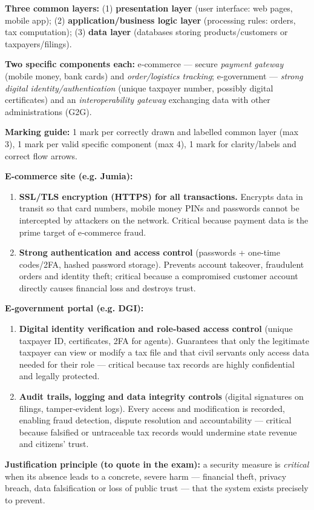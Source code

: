 \documentclass[11pt]{article}
\begin{document}
\begin{corrige}
\textbf{Three common layers:} (1) \textbf{presentation layer} (user interface: web pages, mobile app); (2) \textbf{application/business logic layer} (processing rules: orders, tax computation); (3) \textbf{data layer} (databases storing products/customers or taxpayers/filings).

\textbf{Two specific components each:} e‑commerce — secure \emph{payment gateway} (mobile money, bank cards) and \emph{order/logistics tracking}; e‑government — \emph{strong digital identity/authentication} (unique taxpayer number, possibly digital certificates) and an \emph{interoperability gateway} exchanging data with other administrations (G2G).

\textbf{Marking guide:} 1 mark per correctly drawn and labelled common layer (max 3), 1 mark per valid specific component (max 4), 1 mark for clarity/labels and correct flow arrows.
\end{corrige}

\begin{corrige}
\textbf{E‑commerce site (e.g. Jumia):}
\begin{enumerate}
\item \textbf{SSL/TLS encryption (HTTPS) for all transactions.} Encrypts data in transit so that card numbers, mobile money PINs and passwords cannot be intercepted by attackers on the network. Critical because payment data is the prime target of e‑commerce fraud.
\item \textbf{Strong authentication and access control} (passwords + one‑time codes/2FA, hashed password storage). Prevents account takeover, fraudulent orders and identity theft; critical because a compromised customer account directly causes financial loss and destroys trust.
\end{enumerate}

\textbf{E‑government portal (e.g. DGI):}
\begin{enumerate}
\item \textbf{Digital identity verification and role‑based access control} (unique taxpayer ID, certificates, 2FA for agents). Guarantees that only the legitimate taxpayer can view or modify a tax file and that civil servants only access data needed for their role — critical because tax records are highly confidential and legally protected.
\item \textbf{Audit trails, logging and data integrity controls} (digital signatures on filings, tamper‑evident logs). Every access and modification is recorded, enabling fraud detection, dispute resolution and accountability — critical because falsified or untraceable tax records would undermine state revenue and citizens' trust.
\end{enumerate}

\textbf{Justification principle (to quote in the exam):} a security measure is \emph{critical} when its absence leads to a concrete, severe harm — financial theft, privacy breach, data falsification or loss of public trust — that the system exists precisely to prevent.
\end{corrige}
\end{document}
